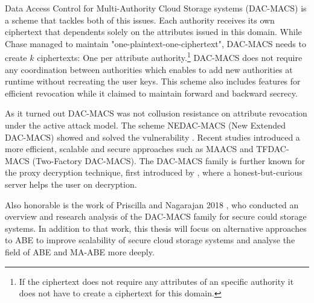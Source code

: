 \documentclass[twocolumn]{article}
\begin{document}
Data Access Control for Multi-Authority Cloud Storage systems (DAC-MACS) \cite{yang2013dac} is a scheme that tackles both of this issues. Each authority receives its own ciphertext that dependents solely on the attributes issued in this domain. While Chase managed to maintain "one-plaintext-one-ciphertext", DAC-MACS needs to create $k$ ciphertexts: One per attribute authority.\footnote{If the ciphertext does not require any attributes of an specific authority it does not have to create a ciphertext for this domain.} DAC-MACS does not require any coordination between authorities which enables to add new authorities at runtime without recreating the user keys. This scheme also includes features for efficient revocation while it claimed to maintain forward and backward secrecy. 

As it turned out DAC-MACS was not collusion resistance on attribute revocation under the active attack model. The scheme NEDAC-MACS (New Extended DAC-MACS) showed and solved the vulnerability \cite{wu2017security}. Recent studies introduced a more efficient, scalable and secure approaches such as MAACS \cite{li2016secure} and TFDAC-MACS (Two-Factory DAC-MACS)\cite{li2017two}. The DAC-MACS family is further known for the proxy decryption technique, first introduced by \cite{li2013matrix}, where a honest-but-curious server helps the user on decryption.

Also honorable is the work of Priscilla and Nagarajan 2018 \cite{nagarajan2018overview}, who conducted an overview and research analysis of the DAC-MACS family for secure could storage systems. In addition to that work, this thesis will focus on alternative approaches to ABE to improve scalability of secure cloud storage systems and analyse the field of ABE and MA-ABE more deeply.   

\end{document}

